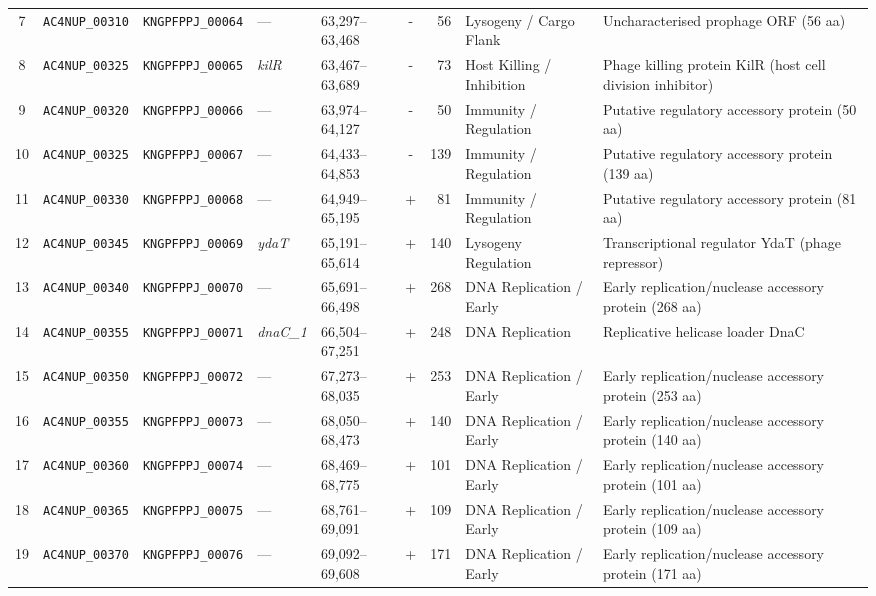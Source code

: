 \begin{landscape}
\begin{xltabular}{\linewidth}{cp{2.4cm}p{2.4cm}p{1.4cm}p{2.6cm}crp{3.2cm}X}
7 & \texttt{AC4NUP\_00310} & \texttt{KNGPFPPJ\_00064} & --- & 63,297--63,468 & - & 56 & Lysogeny / Cargo Flank & Uncharacterised prophage ORF (56 aa) \\
8 & \texttt{AC4NUP\_00325} & \texttt{KNGPFPPJ\_00065} & \textit{kilR} & 63,467--63,689 & - & 73 & Host Killing / Inhibition & Phage killing protein KilR (host cell division inhibitor) \\
9 & \texttt{AC4NUP\_00320} & \texttt{KNGPFPPJ\_00066} & --- & 63,974--64,127 & - & 50 & Immunity / Regulation & Putative regulatory accessory protein (50 aa) \\
10 & \texttt{AC4NUP\_00325} & \texttt{KNGPFPPJ\_00067} & --- & 64,433--64,853 & - & 139 & Immunity / Regulation & Putative regulatory accessory protein (139 aa) \\
11 & \texttt{AC4NUP\_00330} & \texttt{KNGPFPPJ\_00068} & --- & 64,949--65,195 & + & 81 & Immunity / Regulation & Putative regulatory accessory protein (81 aa) \\
12 & \texttt{AC4NUP\_00345} & \texttt{KNGPFPPJ\_00069} & \textit{ydaT} & 65,191--65,614 & + & 140 & Lysogeny Regulation & Transcriptional regulator YdaT (phage repressor) \\
13 & \texttt{AC4NUP\_00340} & \texttt{KNGPFPPJ\_00070} & --- & 65,691--66,498 & + & 268 & DNA Replication / Early & Early replication/nuclease accessory protein (268 aa) \\
14 & \texttt{AC4NUP\_00355} & \texttt{KNGPFPPJ\_00071} & \textit{dnaC\_1} & 66,504--67,251 & + & 248 & DNA Replication & Replicative helicase loader DnaC \\
15 & \texttt{AC4NUP\_00350} & \texttt{KNGPFPPJ\_00072} & --- & 67,273--68,035 & + & 253 & DNA Replication / Early & Early replication/nuclease accessory protein (253 aa) \\
16 & \texttt{AC4NUP\_00355} & \texttt{KNGPFPPJ\_00073} & --- & 68,050--68,473 & + & 140 & DNA Replication / Early & Early replication/nuclease accessory protein (140 aa) \\
17 & \texttt{AC4NUP\_00360} & \texttt{KNGPFPPJ\_00074} & --- & 68,469--68,775 & + & 101 & DNA Replication / Early & Early replication/nuclease accessory protein (101 aa) \\
18 & \texttt{AC4NUP\_00365} & \texttt{KNGPFPPJ\_00075} & --- & 68,761--69,091 & + & 109 & DNA Replication / Early & Early replication/nuclease accessory protein (109 aa) \\
19 & \texttt{AC4NUP\_00370} & \texttt{KNGPFPPJ\_00076} & --- & 69,092--69,608 & + & 171 & DNA Replication / Early & Early replication/nuclease accessory protein (171 aa) \\

\end{xltabular}
\end{landscape}
